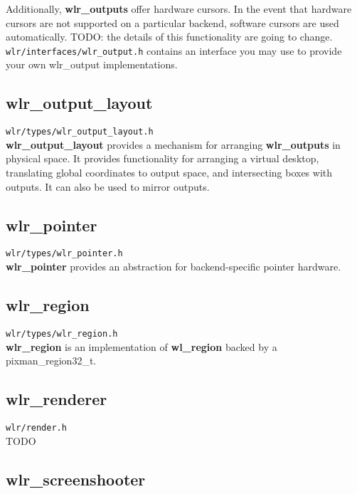 \documentclass{article}
\newcommand{\code}[1]{\texttt{#1}}
\begin{document}
Additionally, \textbf{wlr_outputs} offer hardware cursors. In the event that
hardware cursors are not supported on a particular backend, software cursors
are used automatically. TODO: the details of this functionality are going to
change.\\

\code{wlr/interfaces/wlr_output.h} contains an interface you may use to
provide your own wlr_output implementations.

\subsection{wlr_output_layout}\label{wlr output layout}

\code{wlr/types/wlr_output_layout.h}\\

\textbf{wlr_output_layout} provides a mechanism for arranging
\textbf{wlr_outputs} in physical space. It provides functionality for arranging
a virtual desktop, translating global coordinates to output space, and
intersecting boxes with outputs. It can also be used to mirror outputs.

\subsection{wlr_pointer}\label{wlr pointer}

\code{wlr/types/wlr_pointer.h}\\

\textbf{wlr_pointer} provides an abstraction for backend-specific pointer
hardware.

\subsection{wlr_region}\label{wlr region}

\code{wlr/types/wlr_region.h}\\

\textbf{wlr_region} is an implementation of \textbf{wl_region} backed by
a pixman_region32_t.

\subsection{wlr_renderer}\label{wlr renderer}

\code{wlr/render.h}\\

TODO

\subsection{wlr_screenshooter}\label{wlr screenshooter}
\end{document}
